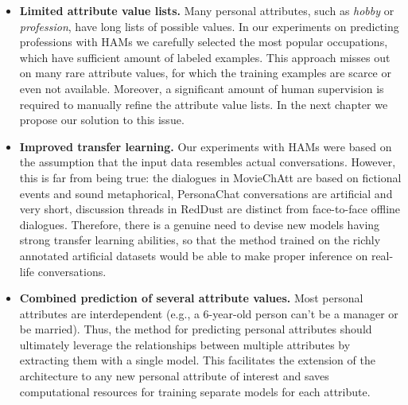 \begin{itemize}
    \item \textbf{Limited attribute value lists.} Many personal attributes, such as \textit{hobby} or \textit{profession}, have long lists of possible values. In our experiments on predicting professions with HAMs we carefully selected the most popular occupations, which have sufficient amount of labeled examples. This approach misses out on many rare attribute values, for which the training examples are scarce or even not available. Moreover, a significant amount of human supervision is required to manually refine the attribute value lists. In the next chapter we propose our solution to this issue.
    
    \item \textbf{Improved transfer learning.} Our experiments with HAMs were based on the assumption that the input data resembles actual conversations. However, this is far from being true: the dialogues in MovieChAtt are based on fictional events and sound metaphorical, PersonaChat conversations are artificial and very short, discussion threads in RedDust are distinct from face-to-face offline dialogues. Therefore, there is a genuine need to devise new models having strong transfer learning abilities, so that the method trained on the richly annotated artificial datasets would be able to make proper inference on real-life conversations. %
    
    \item \textbf{Combined prediction of several attribute values.} Most personal attributes are interdependent (e.g., a 6-year-old person can't be a manager or be married). Thus, the method for predicting personal attributes should ultimately leverage the relationships between multiple attributes by extracting them with a single model. This facilitates the extension of the architecture to any new personal attribute of interest and saves computational resources for training separate models for each attribute.
    
\end{itemize}

